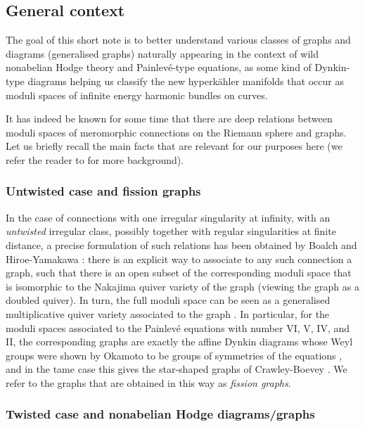 \documentclass[11pt,a4paper]{amsart}
\numberwithin{equation}{section}
\begin{document}
\subsection{General context}

The goal of this short note is to better understand various classes of graphs and diagrams (generalised graphs) naturally appearing in the context of wild nonabelian Hodge theory and Painlevé-type equations, as some kind of Dynkin-type diagrams helping us classify the new hyperkähler manifolds that occur as moduli spaces of infinite energy harmonic bundles on curves. 

It has indeed be known for some time that there are deep relations between moduli spaces of meromorphic connections on the Riemann sphere and graphs. Let us briefly recall the main facts that are relevant for our purposes here (we refer the reader to \cite{boalch2018wild, doucot2021diagrams} for more background).




\subsubsection*{Untwisted case and fission graphs}
In the case of connections with one irregular singularity at infinity, with an \emph{untwisted} irregular class, possibly together with regular singularities at finite distance, a precise formulation of such relations has been obtained by Boalch and Hiroe-Yamakawa \cite{boalch2008irregular, boalch2012simply, hiroe2014moduli}: there is an explicit way to associate to any such connection a graph, such that there is an open subset of the corresponding moduli space that is isomorphic to the Nakajima quiver variety of the graph (viewing the graph as a doubled quiver). In turn, the full moduli space can be seen as a generalised multiplicative quiver variety associated to the graph \cite{boalch2016global}. In particular, for the moduli spaces associated to the Painlevé equations with number VI, V, IV, and II, the corresponding graphs are exactly the affine Dynkin diagrams whose Weyl groups were shown by Okamoto to be groups of symmetries of the equations \cite{okamoto1992painleve}, and in the tame case this gives the star-shaped graphs of Crawley-Boevey \cite{crawley2003matrices}. We refer to the graphs that are obtained in this way as \emph{fission graphs}. 


\subsubsection*{Twisted case and nonabelian Hodge diagrams/graphs}
\end{document}
